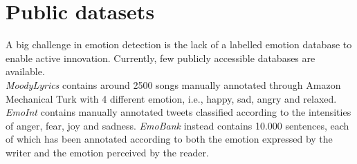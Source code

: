 \section{Public datasets}
A big challenge in emotion detection is the lack of a labelled emotion database to enable active innovation. Currently, few publicly accessible databases are available.\\\textit{MoodyLyrics}\cite{moodylyrics} contains around 2500 songs manually annotated through Amazon Mechanical Turk with 4 different emotion, i.e., happy, sad, angry and relaxed.\\
\textit{EmoInt}\cite{emoint} contains manually annotated tweets classified according to the intensities of anger, fear, joy and sadness. \textit{EmoBank}\cite{emobank} instead contains 10.000 sentences, each of which has been annotated according to both the emotion expressed by the writer and the emotion perceived by the reader. 















